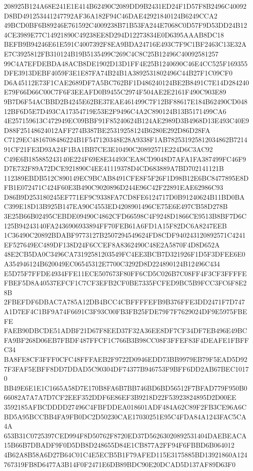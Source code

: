 \documentclass[UTF8,fontset=fandol,zihao=-4,a4paper]{ctexart}
\begin{document}
{{208925B124A68E241E1E414B62490C2089DD9B2431ED24F1D57F8B2496C40092D8BD491253441247792AF36A182F94C46DAE42921840124B6249CCA2
49BCD0BF6B89246E761592C4009238B71B53FA244E7068C0D57F9D53DD24B124CE3989E77C14921890C49238EE8D294D12273834E0D6395AAAB8DC18
BEFB9B94246E61E591C4007392F8EA9BDA24716E493C7F9C1BF2463C13E32AE7C3925812FB310124B19B5135499C269C4C8C25B12496C40092581257
99C4A7EFDEBDA48ACB8DE1902D13D1FF4E25B1240690C46E4CC525F169355DFE3913DEBF4059F3E1E87FA74B24B1A3892531802496C44B27F1C09CF0
D6A45112E73F1CAE2689DF7A5BC762BF1D486240124BE2B8491C7E14D284240E79F66D66C00C7F6F3EEAFD0B9455C2974F504AE2E2161F490C903E89
9B7D6F54ACBBD2B4245E62BE37EAE461499C7F12BF88617E184B62490CD04812BF6D5E7D493CA17354719E53E2F9496C4A2C890124B13B5171499CA6
4E257159613C472949EC09BBF91F85240624B124AE2989D3B4968D13E493C40E9D88F25148624012AFF274B387BE25319258124B6280E292D86D28FA
C7129EC4816708486224B1F547120348E28A9338F1AB782531925812034862B721491CF21FE3D93A24F1BA1BB7CE3E10490C20892571E224D6C3AC92
C49E6B185885243140E224F69E8E34493CEA8CD9048D7AFA1FA387499FC46F9D7E732F89A72DCE921890C4EE41119378D4CD683889A7BD702141121B
112389EBDB512C890149EC9BCAB8491CFE8F5F26F1D98B12E6BC8477895E8DFB1E072471C424F60E3B490C9020896D244E96C42F22891EAE62986C93
D86B9D253180245EF771EF9C9338FA7CD8FE6124717D0B91240624B11BD0BAC399E18D13B925B147EA90C4553ED4208901496CE75E6E497CB58D278B
3E25B66B02495CEBDE09490C4862CFD66598C4F9248D1866CE9513B8BF7D6C125B94243140FA2436906933894FF70FEB61A6FD1A15F82DC6A8247EEB
1C36490C20892BDABF9773127B2507294549624FD8CDF940243120892571C4241EF527649EC489DF138D24F6CCEF8A8362490C48E2A5870F4D8D652A
48E2CB5DA0C3496CA73192581203549FC4EE3BCB7D321926F1D5F3DFEE6E0A354946124B620049EC06545312E7700C3292D8D224890124B12496C434
E5D75F7FFDE4934FFE11ECE507673F80FF6CD5C026B7C08FF4F3CF3FFFFEFBEF5D8A40537EFCF1C7CF3EFB2CF0BE7335FCFED9BC5B9FCC3FC6F8E28B
2FBEFDF6DBAC7A785A12DB4BCC4CBFFFFEFB9B376FFE3DD2471F7D747A1D7EF4C1BF9A74F6691C3F93C00FB3FB25FDE79F7F7629024DF9E5975FBEFE
FAEB90DBCDE51ADBF21D67F8EED37F32A36EE8DF7CF34DF7EB496E49BCFA9BF268D06EB7FBDF487FFCF1C766B3B98CC08F3FFEF83F4DEAFE1FBFFC34
BA8FE8CF3FFF0CFC48FFFAEB2F9722D0946EDD73BB9979EB79F5EAD5D927F3FAF5EBFF8DD7DDAD5C90304DF74377B946753F9BFF6DD2AB67BEC10170
BB49E6E1E1C1665A58D7E170B8FA6B7BB746BD6BD56512F7BFAD779F950B066082A7A7A7D7CF2EEF352DDF6E86EF3B9218D22F53923824895D2D00EE
3592185AFBCDDDD27496C4FBFDDEA018601ADF484A62C89F2FB3CE96A6CBD5A95BCCBB4FA9FB0DC2D50230CAE17030251E95C4FDA84A1243FAC5CA4A
653B31C0725397CED994F8D50762F8720ED37D56263020892531404DAEBEACA15B66B7DBADF9F0D5DB8D248655D84E1CB877A2FF94F6FBBD6B064012
4B62A8B58A6D27B64C01C4E5ECB5B1F79AFED115E3175885BD13921860A124767319FB8D6477A3B14F0F2471E6DB89BDC90E20DCAD5D137AF89D63F0
}}
\end{document}
